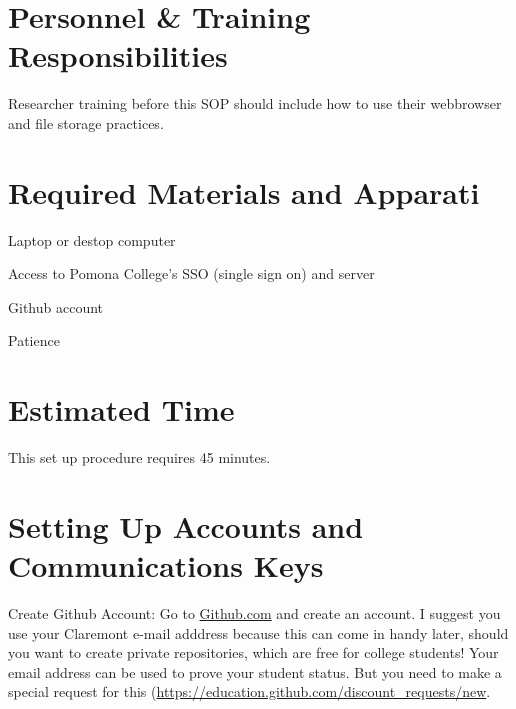 \documentclass[12pt]{../SOP3_beta}
\begin{document}
\section{Personnel \& Training Responsibilities}

\NP Researcher training before this SOP should include how to use their webbrowser and file storage practices. 


\section{Required Materials and Apparati}

\NP Laptop or destop computer

\NP Access to Pomona College's SSO (single sign on) and server

\NP Github account

\NP Patience


\section{Estimated Time}

\NP This set up procedure requires 45 minutes.



\section{Setting Up Accounts and Communications Keys}

\NP Create Github Account: Go to \href{http:\\github.com}{Github.com} and create an account. I suggest you use your Claremont e-mail adddress because this can come in handy later, should you want to create private repositories, which are free for college students! Your email address can be used to prove your student status. But you need to make a special request for this (\url{https://education.github.com/discount_requests/new}.
  
\end{document}
